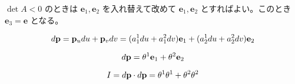 \documentclass[a4paper,11pt]{jsarticle}
\numberwithin{equation}{section}
\begin{document}
$\det A < 0$ のときは $\mathbf{e}_1, \mathbf{e}_2$ を入れ替えて改めて $\mathbf{e}_1, \mathbf{e}_2$ とすればよい。このとき $\mathbf{e}_3 = \mathbf{e}$ となる。

\begin{equation}
d\vb{p} = \vb{p}_u du + \vb{p}_v dv = (a_1^1 du + a_1^2 dv) \mathbf{e}_1 + (a_2^1 du + a_2^2 dv) \mathbf{e}_2
\end{equation}

\begin{equation}
d\vb{p} = \theta^1 \mathbf{e}_1 + \theta^2 \mathbf{e}_2
\end{equation}

\begin{equation}
I = d\vb{p} \cdot d\vb{p} = \theta^1 \theta^1 + \theta^2 \theta^2
\end{equation}

\subsection{}
\end{document}
